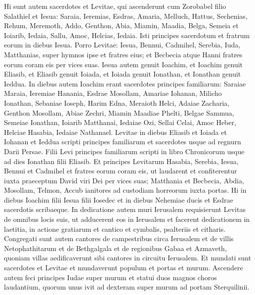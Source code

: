 \begin{biblechapter}  
\verse Hi sunt autem sacerdotes et Levitae, qui ascenderunt cum Zorobabel filio Salathiel et Iesua: Saraia, Ieremias, Esdras, 
\verse Amaria, Melluch, Hattus,  
\verse Sechenias, Rehum, Meremoth, 
\verse Addo, Genthon, Abia, 
\verse Miamin, Maadia, Belga, 
\verse Semeia et Ioiarib, Iedaia, 
\verse Sallu, Amoc, Helcias, Iedaia. Isti principes sacerdotum et fratrum eorum in diebus Iesua. 
\verse Porro Levitae: Iesua, Bennui, Cadmihel, Serebia, Iuda, Matthanias, super hymnos ipse et fratres eius; 
\verse et Becbecia atque Hanni fratres eorum coram eis per vices suas. 
\verse Iesua autem genuit Ioachim, et Ioachim genuit Eliasib, et Eliasib genuit Ioiada, 
\verse et Ioiada genuit Ionathan, et Ionathan genuit Ieddua. 
\verse In diebus autem Ioachim erant sacerdotes principes familiarum: Saraiae Maraia, Ieremiae Hanania, 
\verse Esdrae Mosollam, Amariae Iohanan, 
\verse Milicho Ionathan, Sebaniae Ioseph, 
\verse Harim Edna, Meraioth Helci, 
\verse Adaiae Zacharia, Genthon Mosollam, 
\verse Abiae Zechri, Miamin Maadiae Phelti,  
\verse Belgae Sammua, Semeiae Ionathan, 
\verse Ioiarib Matthanai, Iedaiae Ozi,  
\verse Sellai Celai, Amoc Heber, 
\verse Helciae Hasabia, Iedaiae Nathanael. 
\verse Levitae in diebus Eliasib et Ioiada et Iohanan et Ieddua scripti principes familiarum et sacerdotes usque ad regnurn Darii Persae. 
\verse Filii Levi principes familiarum scripti in libro Chronicorum usque ad dies Ionathan filii Eliasib. 
\verse Et principes Levitarum Hasabia, Serebia, Iesua, Bennui et Cadmihel et fratres eorum coram eis, ut laudarent et confiterentur iuxta praeceptum David viri Dei per vices suas; 
\verse Matthania et Becbecia, Abdia, Mosollam, Telmon, Accub ianitores ad custodiam horreorum iuxta portas. 
\verse Hi in diebus Ioachim filii Iesua filii Iosedec et in diebus Nehemiae ducis et Esdrae sacerdotis scribaeque. 
\verse In dedicatione autem muri Ierusalem requisierunt Levitas de omnibus locis suis, ut adducerent eos in Ierusalem et facerent dedicationem in laetitia, in actione gratiarum et cantico et cymbalis, psalteriis et citharis. 
\verse Congregati sunt autem cantores de campestribus circa Ierusalem et de villis Netophathitarum 
\verse et de Bethgalgala et de regionibus Gabaa et Azmaveth, quoniam villas aedificaverunt sibi cantores in circuitu Ierusalem. 
\verse Et mundati sunt sacerdotes et Levitae et mundaverunt populum et portas et murum. 
\verse Ascendere autem feci principes Iudae super murum et statui duos magnos choros laudantium, quorum unus ivit ad dexteram super murum ad portam Sterquilinii. 

\end{biblechapter}
